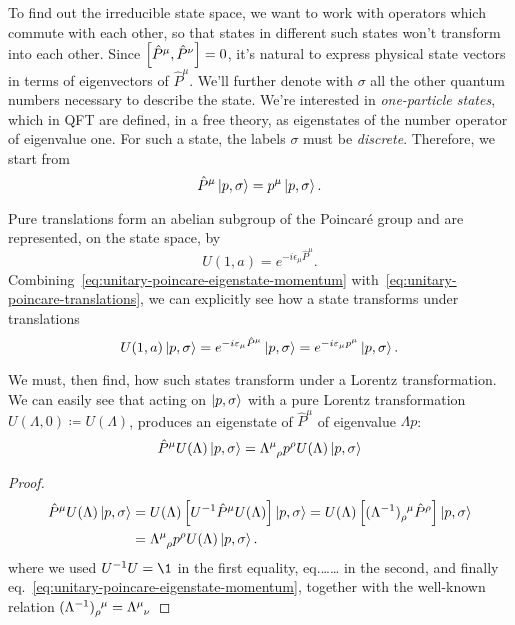 To find out the irreducible state space, we want to work with operators which commute with each other, so that states in different such states won't transform into each other. Since $\comm{\hat{P}^\mu}{\hat{P}^\nu} = 0$, it's natural to express physical state vectors in terms of eigenvectors of $\hat{P}^\mu$. We'll further denote with $\sigma$ all the other quantum numbers necessary to describe the state. We're interested in \emph{one-particle states}, which in QFT are defined, in a free theory, as eigenstates of the number operator of eigenvalue one. For such a state, the labels $\sigma$ must be \emph{discrete}. Therefore, we start from
\begin{equation}\label{eq:unitary-poincare-eigenstate-momentum}
    \hat{P}^\mu \ket{p,\sigma} = p^\mu \ket{p,\sigma} .
\end{equation}

Pure translations form an abelian subgroup of the Poincaré group and are represented, on the state space, by
\begin{equation}\label{eq:unitary-poincare-translations}
    U(1, a) = e^{-i \epsilon_\mu \hat{P}^\mu} .
\end{equation}
Combining~\eqref{eq:unitary-poincare-eigenstate-momentum} with~\eqref{eq:unitary-poincare-translations}, we can explicitly see how a state transforms under translations
\begin{equation}\label{eq:unitary-poincare-state-translation}
    U(1,a)\ket{p,\sigma} = e^{-i \varepsilon_\mu \hat{P}^\mu} \ket{p,\sigma} = e^{-i \varepsilon_\mu p^\mu} \ket{p,\sigma} .
\end{equation}

We must, then find, how such states transform under a Lorentz transformation. We can easily see that acting on $\ket{p,\sigma}$ with a pure Lorentz transformation $U(\Lambda,0) \coloneq U(\Lambda)$, produces an eigenstate of $\hat{P}^\mu$ of eigenvalue $\Lambda p$:
\begin{equation}
    \hat{P}^\mu U(\Lambda) \ket{p,\sigma} = \tensor{\Lambda}{^\mu_\rho} p^\rho U(\Lambda) \ket{p,\sigma}
\end{equation}
\begin{proof}
    \begin{equation*}
    \begin{split}
        \hat{P}^\mu U(\Lambda) \ket{p,\sigma} &= U(\Lambda) \left[U^{-1} \hat{P}^\mu U(\Lambda)\right] \ket{p,\sigma} = U(\Lambda) \left[ \tensor{(\Lambda^{-1})}{_\rho^\mu} \hat{P}^\rho \right] \ket{p,\sigma}  \\
        &= \tensor{\Lambda}{^\mu_\rho} p^\rho U(\Lambda) \ket{p,\sigma} .
    \end{split}
    \end{equation*}
    where we used $U^{-1}U=\1$ in the first equality, eq.\color{red}\dots\dots\color{black} in the second, and finally eq.~\eqref{eq:unitary-poincare-eigenstate-momentum}, together with the well-known relation $\tensor{(\Lambda^{-1})}{_\rho^\mu} = \tensor{\Lambda}{^\mu_\nu}$
\end{proof}

